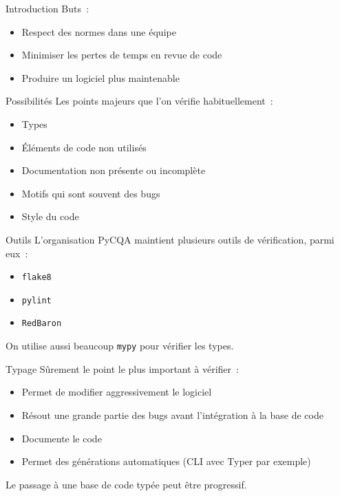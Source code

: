 \begin{frame}{Introduction}
  Buts~:
  \begin{itemize}
    \item Respect des normes dans une équipe
    \item Minimiser les pertes de temps en revue de code
    \item Produire un logiciel plus maintenable
  \end{itemize}
\end{frame}

\begin{frame}{Possibilités}
  Les points majeurs que l'on vérifie habituellement~:

  \begin{itemize}
    \item Types
    \item Éléments de code non utilisés
    \item Documentation non présente ou incomplète
    \item Motifs qui sont souvent des bugs
    \item Style du code
  \end{itemize}
\end{frame}

\begin{frame}{Outils}
  L'organisation PyCQA maintient plusieurs outils de vérification, parmi eux~:

  \begin{itemize}
    \item \texttt{flake8}
    \item \texttt{pylint}
    \item \texttt{RedBaron}
  \end{itemize}

  On utilise aussi beaucoup \texttt{mypy} pour vérifier les types.
\end{frame}

\begin{frame}{Typage}
  Sûrement le point le plus important à vérifier~:

  \begin{itemize}
    \item Permet de modifier aggressivement le logiciel
    \item Résout une grande partie des bugs avant l'intégration à la base de code
    \item Documente le code
    \item Permet des générations automatiques (CLI avec Typer par exemple)
  \end{itemize}

  Le passage à une base de code typée peut être progressif.
\end{frame}


